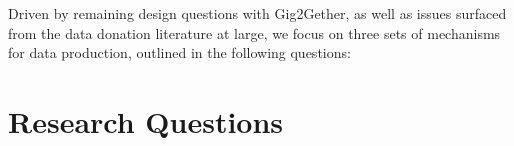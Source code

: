 
Driven by remaining design questions with Gig2Gether, as well as issues surfaced from the data donation literature at large, we focus on three sets of mechanisms for data production, outlined in the following questions:
\section{Research Questions}

